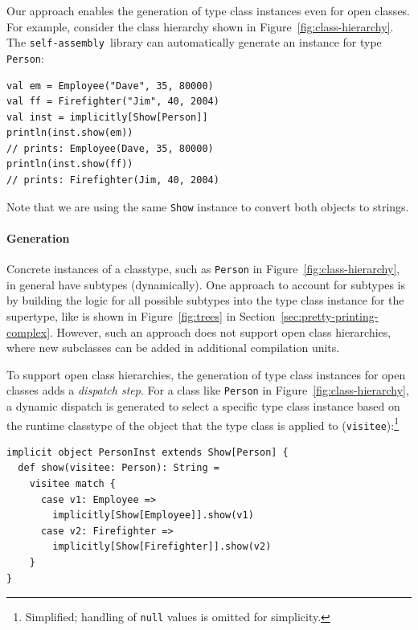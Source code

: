 \documentclass[preprint,nocopyrightspace]{sigplanconf}
\newcommand{\selfassembly}{\texttt{self-assembly~}}
\begin{document}
Our approach enables the generation of type class instances even for open
classes. For example, consider the class hierarchy shown in
Figure~\ref{fig:class-hierarchy}. The \selfassembly library can automatically generate
an instance for type \verb|Person|:

\begin{lstlisting}
val em = Employee("Dave", 35, 80000)
val ff = Firefighter("Jim", 40, 2004)
val inst = implicitly[Show[Person]]
println(inst.show(em))
// prints: Employee(Dave, 35, 80000)
println(inst.show(ff))
// prints: Firefighter(Jim, 40, 2004)
\end{lstlisting}
\noindent
Note that we are using the same \verb|Show| instance to convert both objects
to strings.

\paragraph{Generation}

Concrete instances of a classtype, such as \verb|Person| in
Figure~\ref{fig:class-hierarchy}, in general have subtypes (dynamically). One approach to
account for subtypes is by building the logic for all possible subtypes into
the type class instance for the supertype, like is shown in
Figure~\ref{fig:trees} in Section~\ref{sec:pretty-printing-complex}.
However, such an approach does not support open class hierarchies, where new subclasses can be
added in additional compilation units.

To support open class hierarchies, the generation of type class instances for
open classes adds a {\em dispatch step}. For a class like \verb|Person| in
Figure~\ref{fig:class-hierarchy}, a dynamic dispatch is generated to select a
specific type class instance based on the runtime classtype of the object that the type
class is applied to (\verb|visitee|):\footnote{Simplified; handling of \texttt{null} values is omitted for simplicity.}

\begin{lstlisting}
implicit object PersonInst extends Show[Person] {
  def show(visitee: Person): String =
    visitee match {
      case v1: Employee =>
        implicitly[Show[Employee]].show(v1)
      case v2: Firefighter =>
        implicitly[Show[Firefighter]].show(v2)
    }
}
\end{lstlisting}

\end{document}
